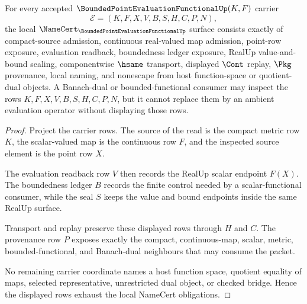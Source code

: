 \begin{theorem}
\label{thm:bounded-point-evaluation-functional-namecert-obligations}
For every accepted $\BoundedPointEvaluationFunctionalUp(K,F)$ carrier
$$
\mathcal{E}=(K,F,X,V,B,S,H,C,P,N),
$$
the local $\NameCert_{\BoundedPointEvaluationFunctionalUp}$ surface consists exactly of compact-source admission, continuous real-valued map admission, point-row exposure, evaluation readback, boundedness ledger exposure, RealUp value-and-bound sealing, componentwise $\hsame$ transport, displayed $\Cont$ replay, $\Pkg$ provenance, local naming, and nonescape from host function-space or quotient-dual objects. A Banach-dual or bounded-functional consumer may inspect the rows $K,F,X,V,B,S,H,C,P,N$, but it cannot replace them by an ambient evaluation operator without displaying those rows.
\end{theorem}
\begin{proof}
Project the carrier rows. The source of the read is the compact metric row $K$, the scalar-valued map is the continuous row $F$, and the inspected source element is the point row $X$.

The evaluation readback row $V$ then records the RealUp scalar endpoint $F(X)$. The boundedness ledger $B$ records the finite control needed by a scalar-functional consumer, while the seal $S$ keeps the value and bound endpoints inside the same RealUp surface.

Transport and replay preserve these displayed rows through $H$ and $C$. The provenance row $P$ exposes exactly the compact, continuous-map, scalar, metric, bounded-functional, and Banach-dual neighbours that may consume the packet.

No remaining carrier coordinate names a host function space, quotient equality of maps, selected representative, unrestricted dual object, or checked bridge. Hence the displayed rows exhaust the local NameCert obligations.
\end{proof}

